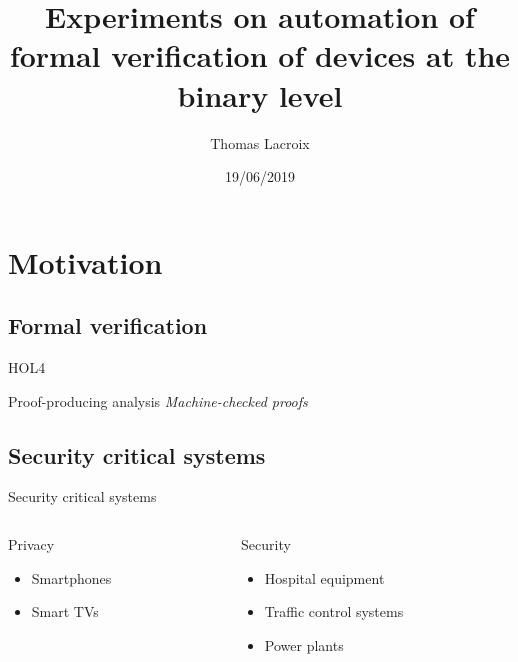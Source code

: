 \documentclass{beamer}
\title{Experiments on automation of formal verification of devices at the binary level}
\subtitle{}
\author{Thomas Lacroix}
\institute{INSA Lyon \\ Soutenance de PFE (Option R\&D)}
\date{19/06/2019}
\begin{document}
\begin{frame}
    \maketitle
\end{frame}


\section{Motivation}

\subsection{Formal verification}

\begin{frame}
\end{frame}

\begin{frame}{HOL4}
\end{frame}

\begin{frame}{Proof-producing analysis}
    \textit{Machine-checked proofs}
\end{frame}

\subsection{Security critical systems}

\begin{frame}{Security critical systems}
    \begin{columns}
        \begin{column}{0.5\textwidth}
            Privacy

            \begin{itemize}
                \item Smartphones
                \item Smart TVs
            \end{itemize}
        \end{column}
        \begin{column}{0.5\textwidth}
            Security

            \begin{itemize}
                \item Hospital equipment
                \item Traffic control systems
                \item Power plants
            \end{itemize}
        \end{column}
    \end{columns}
\end{frame}
\end{document}
